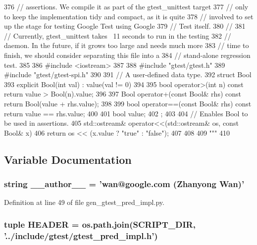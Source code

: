\begin{DoxyCode}
376 // assertions.  We compile it as part of the gtest_unittest target
377 // only to keep the implementation tidy and compact, as it is quite
378 // involved to set up the stage for testing Google Test using Google
379 // Test itself.
380 //
381 // Currently, gtest_unittest takes ~11 seconds to run in the testing
382 // daemon.  In the future, if it grows too large and needs much more
383 // time to finish, we should consider separating this file into a
384 // stand-alone regression test.
385 
386 #include <iostream>
387 
388 #include "gtest/gtest.h"
389 #include "gtest/gtest-spi.h"
390 
391 // A user-defined data type.
392 struct Bool {
393   explicit Bool(int val) : value(val != 0) {}
394 
395   bool operator>(int n) const { return value > Bool(n).value; }
396 
397   Bool operator+(const Bool& rhs) const { return Bool(value + rhs.value); }
398 
399   bool operator==(const Bool& rhs) const { return value == rhs.value; }
400 
401   bool value;
402 };
403 
404 // Enables Bool to be used in assertions.
405 std::ostream& operator<<(std::ostream& os, const Bool& x) {
406   return os << (x.value ? "true" : "false");
407 }
408 
409 """ %
410 

\end{DoxyCode}


\subsection{\-Variable \-Documentation}
\hypertarget{namespacegen__gtest__pred__impl_a629d61dfe4da763164a4d1a2d85b0afd}{
\subsubsection[{\-\_\-\-\_\-author\-\_\-\-\_\-}]{\setlength{\rightskip}{0pt plus 5cm}string {\bf \-\_\-\-\_\-author\-\_\-\-\_\-} = 'wan@google.\-com (\-Zhanyong \-Wan)'}}\label{d0/db7/namespacegen__gtest__pred__impl_a629d61dfe4da763164a4d1a2d85b0afd}


\-Definition at line 49 of file gen\-\_\-gtest\-\_\-pred\-\_\-impl.\-py.

\hypertarget{namespacegen__gtest__pred__impl_a063f4e5a0eb0fad596fcb9e68cb98a7a}{
\subsubsection[{\-H\-E\-A\-D\-E\-R}]{\setlength{\rightskip}{0pt plus 5cm}tuple {\bf \-H\-E\-A\-D\-E\-R} = os.\-path.\-join({\bf \-S\-C\-R\-I\-P\-T\-\_\-\-D\-I\-R}, '../include/gtest/gtest\-\_\-pred\-\_\-impl.\-h')}}\label{d0/db7/namespacegen__gtest__pred__impl_a063f4e5a0eb0fad596fcb9e68cb98a7a}


